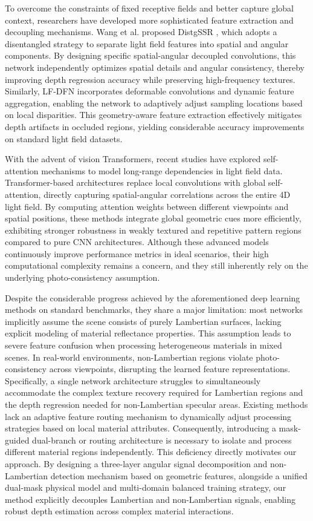 To overcome the constraints of fixed receptive fields and better capture global context, researchers have developed more sophisticated feature extraction and decoupling mechanisms. Wang et al. proposed DistgSSR , which adopts a disentangled strategy to separate light field features into spatial and angular components. By designing specific spatial-angular decoupled convolutions, this network independently optimizes spatial details and angular consistency, thereby improving depth regression accuracy while preserving high-frequency textures. Similarly, LF-DFN incorporates deformable convolutions and dynamic feature aggregation, enabling the network to adaptively adjust sampling locations based on local disparities. This geometry-aware feature extraction effectively mitigates depth artifacts in occluded regions, yielding considerable accuracy improvements on standard light field datasets.

With the advent of vision Transformers, recent studies have explored self-attention mechanisms to model long-range dependencies in light field data. Transformer-based architectures replace local convolutions with global self-attention, directly capturing spatial-angular correlations across the entire 4D light field. By computing attention weights between different viewpoints and spatial positions, these methods integrate global geometric cues more efficiently, exhibiting stronger robustness in weakly textured and repetitive pattern regions compared to pure CNN architectures. Although these advanced models continuously improve performance metrics in ideal scenarios, their high computational complexity remains a concern, and they still inherently rely on the underlying photo-consistency assumption.

Despite the considerable progress achieved by the aforementioned deep learning methods on standard benchmarks, they share a major limitation: most networks implicitly assume the scene consists of purely Lambertian surfaces, lacking explicit modeling of material reflectance properties. This assumption leads to severe feature confusion when processing heterogeneous materials in mixed scenes. In real-world environments, non-Lambertian regions violate photo-consistency across viewpoints, disrupting the learned feature representations. Specifically, a single network architecture struggles to simultaneously accommodate the complex texture recovery required for Lambertian regions and the depth regression needed for non-Lambertian specular areas. Existing methods lack an adaptive feature routing mechanism to dynamically adjust processing strategies based on local material attributes. Consequently, introducing a mask-guided dual-branch or routing architecture is necessary to isolate and process different material regions independently. This deficiency directly motivates our approach. By designing a three-layer angular signal decomposition and non-Lambertian detection mechanism based on geometric features, alongside a unified dual-mask physical model and multi-domain balanced training strategy, our method explicitly decouples Lambertian and non-Lambertian signals, enabling robust depth estimation across complex material interactions.

